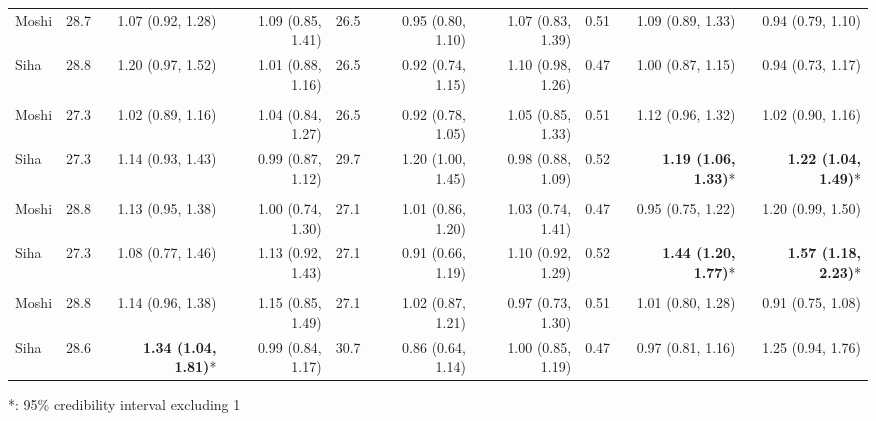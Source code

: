 \begin{table}[t]
\begin{tabular*}{\linewidth}{@{\extracolsep{\fill}}l|rrrrrrrrr}
\midrule\addlinespace[2.5pt]
\multicolumn{10}{l}{Diarrhea} \\[2.5pt] 
\midrule\addlinespace[2.5pt]
Moshi & 28.7 & 1.07 (0.92, 1.28) & 1.09 (0.85, 1.41) & 26.5 & 0.95 (0.80, 1.10) & 1.07 (0.83, 1.39) & 0.51 & 1.09 (0.89, 1.33) & 0.94 (0.79, 1.10) \\ 
Siha & 28.8 & 1.20 (0.97, 1.52) & 1.01 (0.88, 1.16) & 26.5 & 0.92 (0.74, 1.15) & 1.10 (0.98, 1.26) & 0.47 & 1.00 (0.87, 1.15) & 0.94 (0.73, 1.17) \\ 
\midrule\addlinespace[2.5pt]
\multicolumn{10}{l}{Urinary Tract Infections} \\[2.5pt] 
\midrule\addlinespace[2.5pt]
Moshi & 27.3 & 1.02 (0.89, 1.16) & 1.04 (0.84, 1.27) & 26.5 & 0.92 (0.78, 1.05) & 1.05 (0.85, 1.33) & 0.51 & 1.12 (0.96, 1.32) & 1.02 (0.90, 1.16) \\ 
Siha & 27.3 & 1.14 (0.93, 1.43) & 0.99 (0.87, 1.12) & 29.7 & 1.20 (1.00, 1.45) & 0.98 (0.88, 1.09) & 0.52 & \textbf{1.19 (1.06, 1.33)}* & \textbf{1.22 (1.04, 1.49)}* \\ 
\midrule\addlinespace[2.5pt]
\multicolumn{10}{l}{Malaria} \\[2.5pt] 
\midrule\addlinespace[2.5pt]
Moshi & 28.8 & 1.13 (0.95, 1.38) & 1.00 (0.74, 1.30) & 27.1 & 1.01 (0.86, 1.20) & 1.03 (0.74, 1.41) & 0.47 & 0.95 (0.75, 1.22) & 1.20 (0.99, 1.50) \\ 
Siha & 27.3 & 1.08 (0.77, 1.46) & 1.13 (0.92, 1.43) & 27.1 & 0.91 (0.66, 1.19) & 1.10 (0.92, 1.29) & 0.52 & \textbf{1.44 (1.20, 1.77)}* & \textbf{1.57 (1.18, 2.23)}* \\ 
\midrule\addlinespace[2.5pt]
\multicolumn{10}{l}{Infectious Eye Disease} \\[2.5pt] 
\midrule\addlinespace[2.5pt]
Moshi & 28.8 & 1.14 (0.96, 1.38) & 1.15 (0.85, 1.49) & 27.1 & 1.02 (0.87, 1.21) & 0.97 (0.73, 1.30) & 0.51 & 1.01 (0.80, 1.28) & 0.91 (0.75, 1.08) \\ 
Siha & 28.6 & \textbf{1.34 (1.04, 1.81)}* & 0.99 (0.84, 1.17) & 30.7 & 0.86 (0.64, 1.14) & 1.00 (0.85, 1.19) & 0.47 & 0.97 (0.81, 1.16) & 1.25 (0.94, 1.76) \\ 
\bottomrule
\end{tabular*}
\begin{minipage}{\linewidth}
*: 95\% credibility interval excluding 1\\
\end{minipage}
\end{table}

